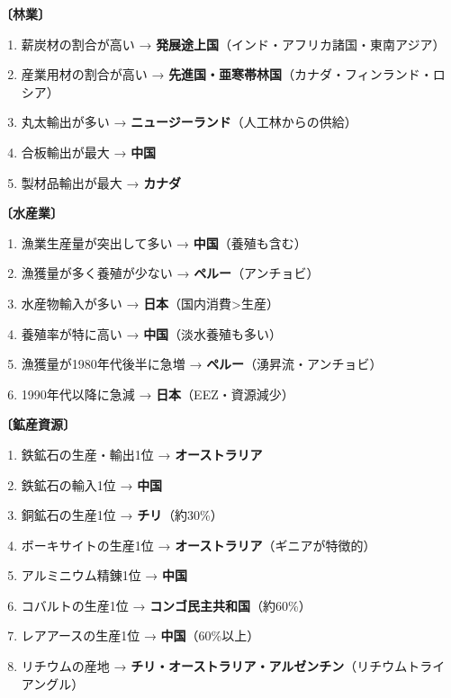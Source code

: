 \documentclass[a4paper,11pt]{article}
\newcommand{\imp}[1]{\textbf{\textcolor{mainred}{#1}}}
\begin{document}
\begin{tcolorbox}[sectionbox, title={■ 統計グラフ判定の鉄則}]

\textbf{〔林業〕}
\begin{enumerate}[leftmargin=1.5em]
  \item 薪炭材の割合が高い → \imp{発展途上国}（インド・アフリカ諸国・東南アジア）
  \item 産業用材の割合が高い → \imp{先進国・亜寒帯林国}（カナダ・フィンランド・ロシア）
  \item 丸太輸出が多い → \imp{ニュージーランド}（人工林からの供給）
  \item 合板輸出が最大 → \imp{中国}
  \item 製材品輸出が最大 → \imp{カナダ}
\end{enumerate}

\medskip
\textbf{〔水産業〕}
\begin{enumerate}[leftmargin=1.5em]
  \item 漁業生産量が突出して多い → \imp{中国}（養殖も含む）
  \item 漁獲量が多く養殖が少ない → \imp{ペルー}（アンチョビ）
  \item 水産物輸入が多い → \imp{日本}（国内消費>生産）
  \item 養殖率が特に高い → \imp{中国}（淡水養殖も多い）
  \item 漁獲量が1980年代後半に急増 → \imp{ペルー}（湧昇流・アンチョビ）
  \item 1990年代以降に急減 → \imp{日本}（EEZ・資源減少）
\end{enumerate}

\medskip
\textbf{〔鉱産資源〕}
\begin{enumerate}[leftmargin=1.5em]
  \item 鉄鉱石の生産・輸出1位 → \imp{オーストラリア}
  \item 鉄鉱石の輸入1位 → \imp{中国}
  \item 銅鉱石の生産1位 → \imp{チリ}（約30\%）
  \item ボーキサイトの生産1位 → \imp{オーストラリア}（ギニアが特徴的）
  \item アルミニウム精錬1位 → \imp{中国}
  \item コバルトの生産1位 → \imp{コンゴ民主共和国}（約60\%）
  \item レアアースの生産1位 → \imp{中国}（60\%以上）
  \item リチウムの産地 → \imp{チリ・オーストラリア・アルゼンチン}（リチウムトライアングル）
\end{enumerate}
\end{tcolorbox}
\end{document}
